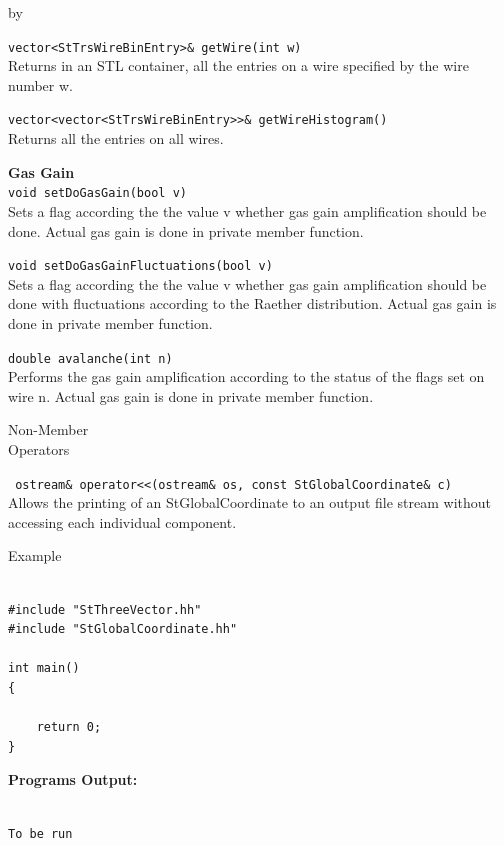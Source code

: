 \documentclass[twoside]{article}
\newcommand{\entrylabel}[1]{\mbox{\textbf{{#1}}}\hfil}%
\newenvironment{entry}
{\begin{list}{}%
    {\renewcommand{\makelabel}{\entrylabel}%
     \setlength{\labelwidth}{90pt}%
     \setlength{\leftmargin}{\labelwidth}
     \advance\leftmargin by \labelsep%
      }%
    }%
  {\end{list}}
\newcommand{\Entrylabel}[1]%
{\raisebox{0pt}[1ex][0pt]{\makebox[\labelwidth][l]%
    {\parbox[t]{\labelwidth}{\hspace{0pt}\textbf{{#1}}}}}}
\newenvironment{Entry}%
{\renewcommand{\entrylabel}{\Entrylabel}\begin{entry}}%
  {\end{entry}}
\begin{document}
\begin{Entry}
  \verb+vector<StTrsWireBinEntry>& getWire(int w)+\\
  Returns in an STL container, all the entries on a wire
  specified by the wire number w.

  \verb+vector<vector<StTrsWireBinEntry>>& getWireHistogram()+\\
  Returns all the entries on all wires.

  {\bf Gas  Gain}\\
  \verb+void setDoGasGain(bool v)+\\
  Sets a flag according the the value v whether gas gain
  amplification should be done.  Actual gas gain is done
  in private member function.

  \verb+void setDoGasGainFluctuations(bool v)+\\
  Sets a flag according the the value v whether gas gain
  amplification should be done with fluctuations according to
  the Raether distribution.  Actual gas gain is done
  in private member function.

  \verb+double avalanche(int n)+\\
  Performs the gas gain amplification according to the status of the
  flags set on wire n.  Actual gas gain is done
  in private member function.
  
\item[Non-Member \\ Operators]

  \verb+ ostream& operator<<(ostream& os, const StGlobalCoordinate& c)+\\
  Allows the printing of an StGlobalCoordinate to an output file stream
  without accessing each individual component.

\item[Example]

{\footnotesize
\begin{verbatim}

#include "StThreeVector.hh"
#include "StGlobalCoordinate.hh"

int main()
{

    return 0;
}
\end{verbatim}
}%
{\bf Programs Output:}
{\footnotesize
\begin{verbatim}

To be run

\end{verbatim}
} %

\end{Entry}
\clearpage
\end{document}
